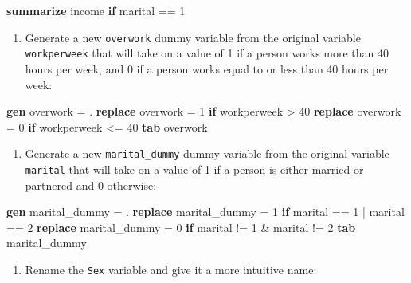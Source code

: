 \documentclass[
]{book}
\newenvironment{Shaded}{\begin{snugshade}}{\end{snugshade}}
\newcommand{\KeywordTok}[1]{\textcolor[rgb]{0.13,0.29,0.53}{\textbf{#1}}}
\newcommand{\NormalTok}[1]{#1}
\providecommand{\tightlist}{%
  \setlength{\itemsep}{0pt}\setlength{\parskip}{0pt}}
\begin{document}
\begin{Shaded}
\begin{Highlighting}[]
\KeywordTok{summarize}\NormalTok{ income }\KeywordTok{if}\NormalTok{ marital == 1}
\end{Highlighting}
\end{Shaded}

\begin{enumerate}
\def\labelenumi{\arabic{enumi}.}
\setcounter{enumi}{2}
\tightlist
\item
  Generate a new \texttt{overwork} dummy variable from the original variable \texttt{workperweek} that will take on a value of 1 if a person works more than 40 hours per week, and 0 if a person works equal to or less than 40 hours per week:
\end{enumerate}

\begin{Shaded}
\begin{Highlighting}[]
\KeywordTok{gen}\NormalTok{ overwork = .}
\KeywordTok{replace}\NormalTok{ overwork = 1 }\KeywordTok{if}\NormalTok{ workperweek \textgreater{} 40}
\KeywordTok{replace}\NormalTok{ overwork = 0 }\KeywordTok{if}\NormalTok{ workperweek \textless{}= 40}
\KeywordTok{tab}\NormalTok{ overwork}
\end{Highlighting}
\end{Shaded}

\begin{enumerate}
\def\labelenumi{\arabic{enumi}.}
\setcounter{enumi}{3}
\tightlist
\item
  Generate a new \texttt{marital\_dummy} dummy variable from the original variable \texttt{marital} that will take on a value of 1 if a person is either married or partnered and 0 otherwise:
\end{enumerate}

\begin{Shaded}
\begin{Highlighting}[]
\KeywordTok{gen}\NormalTok{ marital\_dummy = .}
\KeywordTok{replace}\NormalTok{ marital\_dummy = 1 }\KeywordTok{if}\NormalTok{ marital == 1 | marital == 2}
\KeywordTok{replace}\NormalTok{ marital\_dummy = 0 }\KeywordTok{if}\NormalTok{ marital != 1 \& marital != 2}
\KeywordTok{tab}\NormalTok{ marital\_dummy}
\end{Highlighting}
\end{Shaded}

\begin{enumerate}
\def\labelenumi{\arabic{enumi}.}
\setcounter{enumi}{4}
\tightlist
\item
  Rename the \texttt{Sex} variable and give it a more intuitive name:
\end{enumerate}
\end{document}
